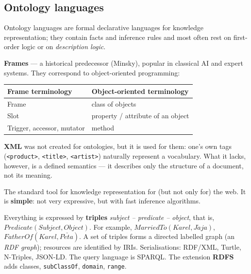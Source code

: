 \documentclass[11pt,a4paper]{article}
\theoremstyle{definition}
\begin{document}
\subsection{Ontology languages}

Ontology languages are formal declarative languages for knowledge representation; they contain facts
and inference rules and most often rest on first-order logic or on \emph{description logic}.

\textbf{Frames} --- a historical predecessor (Minsky), popular in classical AI and expert systems.
They correspond to object-oriented programming:

\begin{center}\small
\begin{tabular}{ll}
\toprule
\textbf{Frame terminology} & \textbf{Object-oriented terminology} \\
\midrule
Frame & class of objects \\
Slot & property / attribute of an object \\
Trigger, accessor, mutator & method \\
\bottomrule
\end{tabular}
\end{center}

\textbf{XML} was not created for ontologies, but it is used for them: one's own tags
(\texttt{<product>}, \texttt{<title>}, \texttt{<artist>}) naturally represent a vocabulary.
What it lacks, however, is a defined semantics --- it describes only the structure of a
document, not its meaning.

\begin{defbox}
The standard tool for knowledge representation for (but not only for) the web. It is
\textbf{simple}: not very expressive, but with fast inference algorithms.

Everything is expressed by \textbf{triples} \emph{subject -- predicate -- object}, that is,
$\mathit{Predicate}(\mathit{Subject},\mathit{Object})$. For example,
$\mathit{MarriedTo}(\mathit{Karel},\mathit{J\acute{a}ja})$,
$\mathit{FatherOf}(\mathit{Karel},\mathit{P\acute{e}\check{t}a})$.
A set of triples forms a directed labelled graph (an \emph{RDF graph}); resources are identified by
IRIs. Serialisations: RDF/XML, Turtle, N-Triples, JSON-LD. The query language is SPARQL.
The extension \textbf{RDFS} adds classes, \texttt{subClassOf}, \texttt{domain}, \texttt{range}.
\end{defbox}
\end{document}
